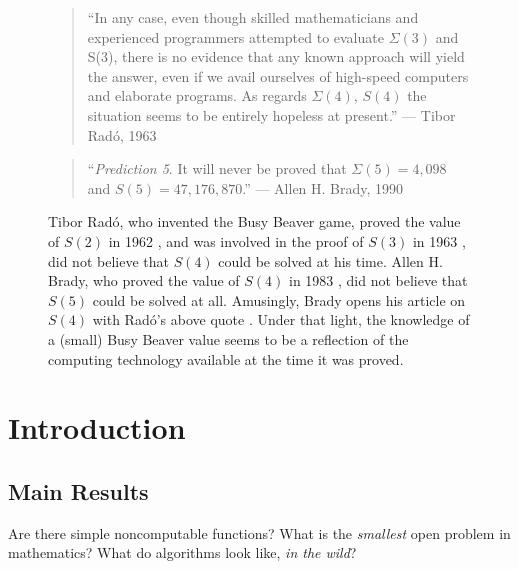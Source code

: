\documentclass[a4paper,british]{article}
\theoremstyle{definition} %
\numberwithin{equation}{section}
\theoremstyle{definition} %
\newcommand{\BBtheFifth}{47{,}176{,}870}
\newcommand{\SigmaTheFifth}{4{,}098}
\newcommand{\radofull}{Tibor Rad\'o\xspace}
\newcommand{\rado}{Rad\'o\xspace}
\begin{document}
\begin{figure}
    \begin{quote}
        ``In any case, even though skilled mathematicians and experienced programmers attempted to evaluate $\Sigma(3)$ and S(3), there is no evidence that any known approach will yield the answer, even if we avail ourselves of high-speed computers and elaborate programs. As regards $\Sigma(4)$, $S(4)$ the situation seems to be entirely hopeless at present.'' --- \radofull, 1963 \cite{Rado_1963}
    \end{quote}
    \begin{quote}
        ``\textit{Prediction 5}. It will never be proved that $\Sigma(5) = \SigmaTheFifth$ and $S(5) = \BBtheFifth$.'' --- Allen H. Brady, 1990 \cite{BradyMeaningOfLife}
    \end{quote}
    \caption{\radofull, who invented the Busy Beaver game, proved the value of $S(2)$ in 1962 \cite{Rado_1962}, and was involved in the proof of $S(3)$ in 1963 \cite{Lin1963}, did not believe that $S(4)$ could be solved at his time. Allen H. Brady, who proved the value of $S(4)$ in 1983 \cite{Brady83}, did not believe that $S(5)$ could be solved at all. Amusingly, Brady opens his article on $S(4)$ with \rado's above quote \cite{Brady83}. Under that light, the knowledge of a (small) Busy Beaver value seems to be a reflection of the computing technology available at the time it was proved.}
\end{figure}

\vspace{-40pt}

\section{Introduction}\label{sec:intro}

\subsection{Main Results}\label{sec:intro:mainresults}

\newcommand{\noncomput}{noncomputable\xspace}
\newcommand{\BBfull}{Busy Beaver\xspace}
\newcommand{\Coq}{Coq\xspace}
\newcommand{\CoqProofReleaseURL}{\url{https://github.com/ccz181078/Coq-BB5}}

\newcommand{\ie}{i.e.~}
\newcommand{\eg}{e.g.~}

Are there simple \noncomput functions? What is the \textit{smallest} open problem in mathematics? What do algorithms look like, \textit{in the wild}?
\end{document}
